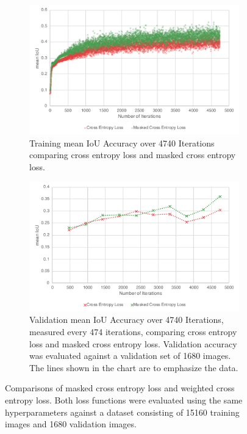 \begin{figure}
	\centering
	\begin{subfigure}{\textwidth}
		\includegraphics[width=\textwidth]{figures/experiments/loss-comparison-training.pdf}
		\caption[Loss Comparison Chart: Training]{Training mean IoU Accuracy over 4740 Iterations comparing cross entropy loss and masked cross entropy loss.}
		\label{chart:experiments-losstraining}
	\end{subfigure}
	\newline
	\begin{subfigure}{\textwidth}
		\includegraphics[width=\textwidth]{figures/experiments/loss-comparison-validation.pdf}
		\caption[Loss Comparison Chart: Validation]{Validation mean IoU Accuracy over 4740 Iterations, measured every 474 iterations, comparing cross entropy loss and masked cross entropy loss. Validation accuracy was evaluated against a validation set of 1680 images. The lines shown in the chart are to emphasize the data.}
		\label{chart:experiments-lossvalidation}
	\end{subfigure}
	\caption[Loss Comparison Chart]{Comparisons of masked cross entropy loss and weighted cross entropy loss. Both loss functions were evaluated using the same hyperparameters against a dataset consisting of 15160 training images and 1680 validation images.}
\end{figure}